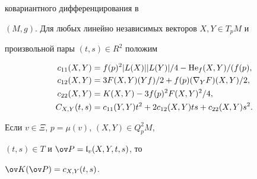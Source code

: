 ковариантного дифференцирования в 


$(M,g)$. Для любых линейно независимых векторов $X,Y\in T_pM$ и 


произвольной пары $(t,s)\in R^2$ положим 


\begin{align*} 


c_{11}(X,Y)&=f(p)^2|L(X)||L(Y)|/4-\He_f(X,Y)/(f(p),\\ 


c_{12}(X,Y)&=3F(X,Y)(Yf)/2+f(p)(\nabla_YF)(X,Y)/2,\\ 


c_{22}(X,Y)&=K(X,Y)-3f(p)^2F(X,Y)^2/4,\\ 


C_{X,Y}(t,s)&=c_{11}(Y,Y)t^2+2c_{12}(X,Y)ts+c_{22}(X,Y)s^2. 


\end{align*} 


 


\begin{thm} Если $v\in\Xi$, $p=\mu(v)$, $(X,Y)\in Q^2_pM$, 


$(t,s)\in T$ и $\ov P=\frak l_v(X,Y,t,s)$, то 


$\ov K(\ov P)=c_{X,Y}(t,s)$. 


\end{thm} 


 


